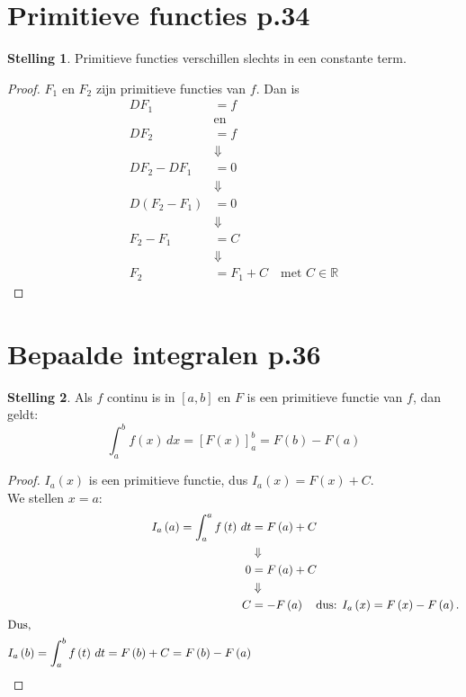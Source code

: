 \documentclass{article}
\theoremstyle{definition}
\newtheorem*{Stelling}{Stelling}
\begin{document}
\section{Primitieve functies p.34}
\begin{Stelling}
  Primitieve functies verschillen slechts in een constante term.
\end{Stelling}
\begin{proof}
  $F_1$ en $F_2$ zijn primitieve functies van $f$. Dan is
  \begin{align*}
    DF_1 &= f\\
         &\text{en}\\
    DF_2&=f\\
         &\Downarrow\\
    DF_2-DF_1 &= 0\\
              &\Downarrow\\
    D\left(F_2-F_1\right)&=0\\
                        &\Downarrow\\
      F_2-F_1&=C\\
             &\Downarrow\\
      F_2&=F_1+C \quad \text{met } C\in\mathbb{R}    
  \end{align*}
\end{proof}
\section{Bepaalde integralen p.36}
\begin{Stelling}
 Als $f$ continu is in $\left[a,b\right]$ en $F$ is een primitieve functie van $f$, dan geldt:
 $$\displaystyle\int_{a}^{b}f\left(x\right)\,dx = \left[F\left(x\right)\right]_a^b = F\left(b\right) - F\left(a\right) $$
\end{Stelling}
\begin{proof}
  $I_a\left(x\right)$ is een primitieve functie, dus $I_a\left(x\right) = F\left(x\right) + C.$\\
  We stellen $x=a$:
  \begin{align*}
    I_a\left(a\right)=\displaystyle\int_{a}^{a}f\left(t\right)\,dt &= F\left(a\right)+C\\
                                             &\Downarrow\\
    0&=F\left(a\right)+C\\
                                             &\Downarrow\\
    C &= -F\left(a\right) \quad \text{dus: } I_a\left(x\right) = F\left(x\right)-F\left(a\right).\\
    \intertext{Dus, }
    I_a\left(b\right) = \displaystyle\int_{a}^{b}f\left(t\right)\,dt= F\left(b\right) + C = F\left(b\right)-F\left(a\right)
  \end{align*}
\end{proof}
\end{document}
